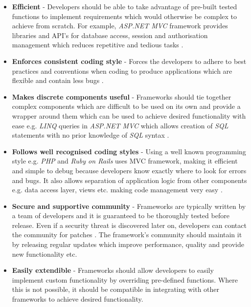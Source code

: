 \begin{itemize}
    \item \textbf{Efficient} - Developers should be able to take advantage of pre-built tested functions to implement requirements which would otherwise be complex to achieve from scratch. For example, \textit{ASP.NET MVC} framework provides libraries and API’s for database access, session and authorisation management which reduces repetitive and tedious tasks \cite{asp.net-team}.

    \item \textbf{Enforces consistent coding style} - Forces the developers to adhere to best practices and conventions when coding to produce applications which are flexible and contain less bugs \cite{cimetrix}.

    \item \textbf{Makes discrete components useful} - Frameworks should tie together complex components which are difficult to be used on its own and provide a wrapper around them which can be used to achieve desired functionality with ease e.g. \textit{LINQ} queries in \textit{ASP.NET MVC} which allows creation of \textit{SQL} statements with no prior knowledge of \textit{SQL} syntax \cite{social-msdn}.

    \item \textbf{Follows well recognised coding styles} - Using a well known programming style e.g. \textit{PHP} and \textit{Ruby on Rails} uses MVC framework, making it efficient and simple to debug because developers know exactly where to look for errors and bugs. It also allows separation of application logic from other components e.g. data access layer, views etc. making code management very easy \cite{speckyboy}.

	  \item \textbf{Secure and supportive community} - Frameworks are typically written by a team of developers and it is guaranteed to be thoroughly tested before release. Even if a security threat is discovered later on, developers can contact the community for patches \cite{OSTraining}. The framework’s community should maintain it by releasing regular updates which improve performance, quality and provide new functionality etc. \cite{cimetrix}

	  \item \textbf{Easily extendible} - Frameworks should allow developers to easily implement custom functionality by overriding pre-defined functions. Where this is not possible, it should be compatible in integrating with other frameworks to achieve desired functionality.
\end{itemize}

